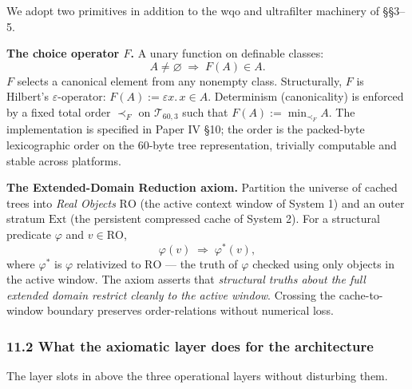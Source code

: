 \documentclass[
  11pt,
]{article}
\begin{document}
We adopt two primitives in addition to the wqo and ultrafilter machinery
of §§3--5.

\textbf{The choice operator \(F\).} A unary function on definable
classes: \[A \ne \varnothing \;\Longrightarrow\; F(A) \in A.\] \(F\)
selects a canonical element from any nonempty class. Structurally, \(F\)
is Hilbert's \(\varepsilon\)-operator:
\(F(A) := \varepsilon x.\, x \in A\). Determinism (canonicality) is
enforced by a fixed total order \(\prec_F\) on \(\mathcal{T}_{60,3}\)
such that \(F(A) := \min_{\prec_F} A\). The implementation is specified
in Paper IV §10; the order is the packed-byte lexicographic order on the
60-byte tree representation, trivially computable and stable across
platforms.

\textbf{The Extended-Domain Reduction axiom.} Partition the universe of
cached trees into \emph{Real Objects} \(\mathrm{RO}\) (the active
context window of System 1) and an outer stratum \(\mathrm{Ext}\) (the
persistent compressed cache of System 2). For a structural predicate
\(\varphi\) and \(v \in \mathrm{RO}\),
\[\varphi(v) \;\Longrightarrow\; \varphi^*(v),\] where \(\varphi^*\) is
\(\varphi\) relativized to \(\mathrm{RO}\) --- the truth of \(\varphi\)
checked using only objects in the active window. The axiom asserts that
\emph{structural truths about the full extended domain restrict cleanly
to the active window}. Crossing the cache-to-window boundary preserves
order-relations without numerical loss.

\hypertarget{what-the-axiomatic-layer-does-for-the-architecture}{%
\subsubsection{11.2 What the axiomatic layer does for the
architecture}\label{what-the-axiomatic-layer-does-for-the-architecture}}

The layer slots in above the three operational layers without disturbing
them.
\end{document}
